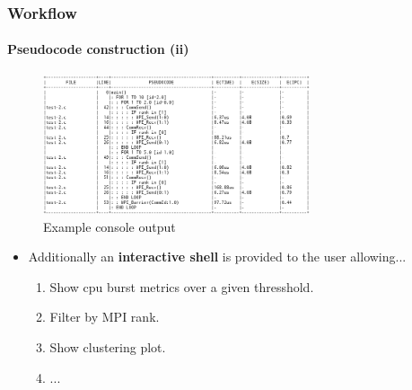 \documentclass{beamer}
\begin{document}
\begin{frame}
\frametitle{Workflow}
\framesubtitle{Pseudocode construction (ii)}
\begin{figure}
	\includegraphics[width=0.7\textwidth]{imgs/console_gui_example_1.png}
	\caption{Example console output}
\end{figure}
\pause
\begin{itemize}
	\item Additionally an \textbf{interactive shell} is provided to the user allowing...
	\begin{enumerate}
		\item Show cpu burst metrics over a given thresshold.
		\item Filter by MPI rank.
		\item Show clustering plot.
		\item ...
	\end{enumerate}
\end{itemize}
\end{frame}
\end{document}
